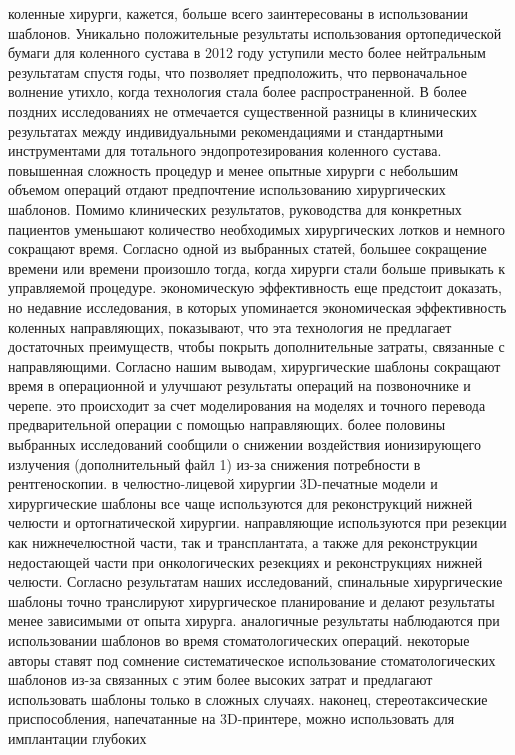 коленные хирурги, кажется, больше всего заинтересованы в использовании шаблонов.
Уникально положительные результаты использования ортопедической бумаги для
коленного сустава в 2012 году уступили место более нейтральным результатам
спустя годы, что позволяет предположить, что первоначальное волнение утихло,
когда технология стала более распространенной. В более поздних исследованиях не
отмечается существенной разницы в клинических результатах между индивидуальными
рекомендациями и стандартными инструментами для тотального эндопротезирования
коленного сустава. повышенная сложность процедур и менее опытные хирурги с
небольшим объемом операций отдают предпочтение использованию хирургических
шаблонов. Помимо клинических результатов, руководства для конкретных пациентов
уменьшают количество необходимых хирургических лотков и немного сокращают время.
Согласно одной из выбранных статей, большее сокращение времени или времени
произошло тогда, когда хирурги стали больше привыкать к управляемой процедуре.
экономическую эффективность еще предстоит доказать, но недавние исследования, в
которых упоминается экономическая эффективность коленных направляющих,
показывают, что эта технология не предлагает достаточных преимуществ, чтобы
покрыть дополнительные затраты, связанные с направляющими. Согласно нашим
выводам, хирургические шаблоны сокращают время в операционной и улучшают
результаты операций на позвоночнике и черепе. это происходит за счет
моделирования на моделях и точного перевода предварительной операции с помощью
направляющих. более половины выбранных исследований сообщили о снижении
воздействия ионизирующего излучения (дополнительный файл 1) из-за снижения
потребности в рентгеноскопии. в челюстно-лицевой хирургии 3D-печатные модели и
хирургические шаблоны все чаще используются для реконструкций нижней челюсти и
ортогнатической хирургии. направляющие используются при резекции как
нижнечелюстной части, так и трансплантата, а также для реконструкции недостающей
части при онкологических резекциях и реконструкциях нижней челюсти. Согласно
результатам наших исследований, спинальные хирургические шаблоны точно
транслируют хирургическое планирование и делают результаты менее зависимыми от
опыта хирурга. аналогичные результаты наблюдаются при использовании шаблонов во
время стоматологических операций. некоторые авторы ставят под сомнение
систематическое использование стоматологических шаблонов из-за связанных с этим
более высоких затрат и предлагают использовать шаблоны только в сложных случаях.
наконец, стереотаксические приспособления, напечатанные на 3D-принтере, можно
использовать для имплантации глубоких

